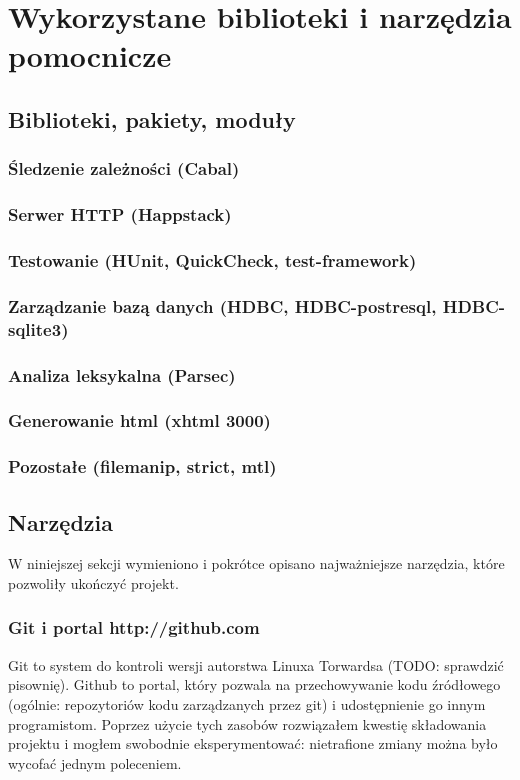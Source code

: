 \documentclass[10pt,leqno]{article}
\begin{document}
\section{Wykorzystane biblioteki i narzędzia pomocnicze}
\subsection{Biblioteki, pakiety, moduły}
\subsubsection{Śledzenie zależności (Cabal)}
\subsubsection{Serwer HTTP (Happstack)}
\subsubsection{Testowanie (HUnit, QuickCheck, test-framework)}
\subsubsection{Zarządzanie bazą danych (HDBC, HDBC-postresql, HDBC-sqlite3)}
\subsubsection{Analiza leksykalna (Parsec)}
\subsubsection{Generowanie html (xhtml 3000)}
\subsubsection{Pozostałe (filemanip, strict, mtl)}

\subsection{Narzędzia}
W niniejszej sekcji wymieniono i pokrótce opisano najważniejsze narzędzia, które pozwoliły ukończyć projekt.

\subsubsection{Git i portal http://github.com}
Git to system do kontroli wersji autorstwa Linuxa Torwardsa (TODO: sprawdzić pisownię). Github to portal, który pozwala
na przechowywanie kodu źródłowego (ogólnie: repozytoriów kodu zarządzanych przez git) i udostępnienie go innym programistom.
Poprzez użycie tych zasobów rozwiązałem kwestię składowania projektu i mogłem swobodnie eksperymentować: nietrafione zmiany
można było wycofać jednym poleceniem.
\end{document}
